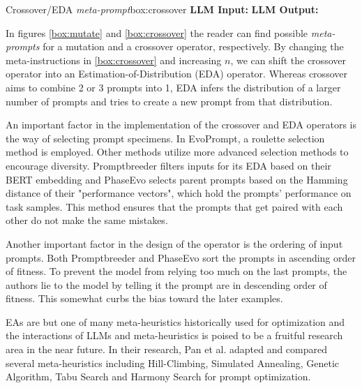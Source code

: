 \begin{figurebox}{Crossover/EDA \textit{meta-prompt}}{box:crossover}
    \textbf{LLM Input:} 
    \textbf{LLM Output:}
\end{figurebox}

In figures \ref{box:mutate} and \ref{box:crossover} the reader can find possible \textit{meta-prompts} for a mutation and a crossover operator, respectively.
By changing the meta-instructions in \ref{box:crossover} and increasing $n$, we can shift the crossover operator into an Estimation-of-Distribution (EDA)
operator. Whereas crossover aims to combine 2 or 3 prompts into 1, EDA infers the distribution of a larger number of prompts and tries to 
create a new prompt from that distribution. 

An important factor in the implementation of the crossover and EDA operators is the way of selecting prompt specimens.
In EvoPrompt\cite{guo2024connectinglargelanguagemodels}, a roulette selection method is employed. Other methods utilize more advanced
selection methods to encourage diversity. Promptbreeder\cite{fernando2023promptbreederselfreferentialselfimprovementprompt} filters inputs
for its EDA based on their BERT embedding and PhaseEvo\cite{cui2024phaseevounifiedincontextprompt} selects parent prompts
based on the Hamming distance of their "performance vectors", which hold the prompts' performance on task samples.  
This method ensures that the prompts that get paired with each other do not make the same mistakes.

Another important factor in the design of the operator is the ordering of input prompts. Both Promptbreeder and PhaseEvo sort 
the prompts in ascending order of fitness. To prevent the model from relying too much on the last prompts, the authors
lie to the model by telling it the prompt are in descending order of fitness. 
This somewhat curbs the bias toward the later examples\cite{fernando2023promptbreederselfreferentialselfimprovementprompt}.

EAs are but one of many meta-heuristics historically used for optimization and the 
interactions of LLMs and meta-heuristics is poised to be a fruitful research area in the near future.
In their research, Pan et al.\cite{pan2024plumpromptlearningusing} adapted and compared several meta-heuristics
including Hill-Climbing, Simulated Annealing, Genetic Algorithm, Tabu Search and Harmony Search for prompt optimization.


